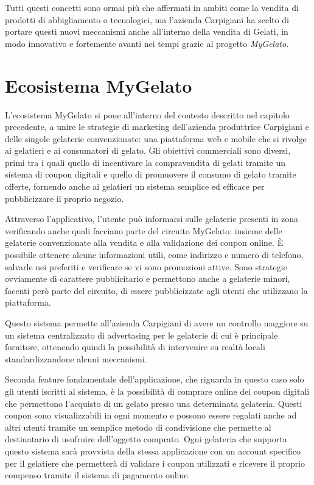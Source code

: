 Tutti questi concetti sono ormai più che affermati in ambiti come
la vendita di prodotti di abbigliamento o tecnologici, ma l'azienda
Carpigiani ha scelto di portare questi nuovi meccanismi anche all'interno
della vendita di Gelati, in modo innovativo e fortemente avanti nei
tempi grazie al progetto \emph{MyGelato}.

\section{Ecosistema MyGelato}

L'ecosistema MyGelato si pone all'interno del contesto descritto nel
capitolo precedente, a unire le strategie di marketing dell'azienda
produttrice Carpigiani e delle singole gelaterie convenzionate: una
piattaforma web e mobile che si rivolge ai gelatieri e ai consumatori
di gelato. Gli obiettivi commerciali sono diversi, primi tra i quali
quello di incentivare la compravendita di gelati tramite un sistema
di coupon digitali e quello di promuovere il consumo di gelato tramite
offerte, fornendo anche ai gelatieri un sistema semplice ed efficace
per pubblicizzare il proprio negozio.\bigskip{}

Attraverso l'applicativo, l'utente può informarsi sulle gelaterie
presenti in zona verificando anche quali facciano parte del circuito
MyGelato: insieme delle gelaterie convenzionate alla vendita e alla
validazione dei coupon online. È possibile ottenere alcune informazioni
utili, come indirizzo e numero di telefono, salvarle nei preferiti
e verificare se vi sono promozioni attive. Sono strategie ovviamente
di carattere pubblicitario e permettono anche a gelaterie minori,
facenti però parte del circuito, di essere pubblicizzate agli utenti
che utilizzano la piattaforma.

Questo sistema permette all'azienda Carpigiani di avere un controllo
maggiore su un sistema centralizzato di advertasing per le gelaterie
di cui è principale fornitore, ottenendo quindi la possibilità di
intervenire su realtà locali standardizzandone alcuni meccanismi.\bigskip{}

Seconda feature fondamentale dell'applicazione, che riguarda in questo
caso solo gli utenti iscritti al sistema, è la possibilità di comprare
online dei coupon digitali che permettono l'acquisto di un gelato
presso una determinata gelateria. Questi coupon sono visualizzabili
in ogni momento e possono essere regalati anche ad altri utenti tramite
un semplice metodo di condivisione che permette al destinatario di
usufruire dell'oggetto comprato. Ogni gelateria che supporta questo
sistema sarà provvista della stessa applicazione con un account specifico
per il gelatiere che permetterà di validare i coupon utilizzati e
ricevere il proprio compenso tramite il sistema di pagamento online.

